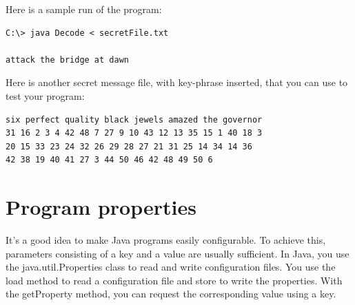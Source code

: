 \begin{oefening}
Here is a sample run of the program:

\begin{verbatim}
C:\> java Decode < secretFile.txt

attack the bridge at dawn
\end{verbatim}


Here is another secret message file, with key-phrase inserted, that you can use to test your program:

\begin{verbatim}
six perfect quality black jewels amazed the governor
31 16 2 3 4 42 48 7 27 9 10 43 12 13 35 15 1 40 18 3 
20 15 33 23 24 32 26 29 28 27 21 31 25 14 34 14 36 
42 38 19 40 41 27 3 44 50 46 42 48 49 50 6
\end{verbatim}

\end{oefening}


\section{Program properties}

It's a good idea to make Java programs easily configurable. To achieve this, parameters consisting of a key and a value are usually sufficient. In Java, you use the java.util.Properties class to read and write configuration files. You use the load method to read a configuration file and store to write the properties. With the getProperty method, you can request the corresponding value using a key.

